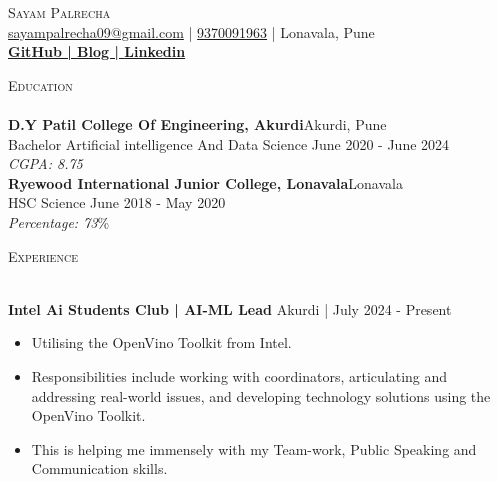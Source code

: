 \documentclass[a4paper]{article}
\newcommand{\lineunder} {
    \vspace*{-8pt} \\
    \hspace*{-18pt} \hrulefill \\
}
\newcommand{\header} [1] {
    {\hspace*{-18pt}\vspace*{6pt} \textsc{#1}}
    \vspace*{-6pt} \lineunder
}
\begin{document}
    \vspace*{-40pt}

    

%
%
  \vspace*{-2pt}
  \begin{center}
    {\Huge \scshape {Sayam Palrecha}}\\
    \vspace*{2pt}
    \href{mailto:sayampalrecha09@gmail.com}{sayampalrecha09@gmail.com} | \href{tel:9370091963}{9370091963} | Lonavala, Pune\\
    \vspace*{2pt}
    \textbf{\href{https://github.com/sayampalrecha}{GitHub | }}\textbf{\href{https://medium.com/@sayampalrecha09}{Blog | }}\textbf{\href{https://www.linkedin.com/in/sayampalrecha/}{Linkedin}}\\
  \end{center}



      \header{Education}
      \vspace{2mm}
      \textbf{D.Y Patil College Of Engineering, Akurdi}\hfill Akurdi, Pune\\
Bachelor Artificial intelligence And Data Science \hfill June 2020 - June 2024\\
{\sl CGPA: 8.75}\\
\vspace{2mm}
      \textbf{Ryewood International Junior College, Lonavala}\hfill Lonavala\\
HSC Science \hfill June 2018 - May 2020\\
{\sl Percentage: 73}\%\\
\vspace{2mm}

      \header{Experience}
      \vspace{2mm}

      \textbf{Intel Ai Students Club | AI-ML Lead} \hfill Akurdi | July 2024 - Present\\
          \vspace{-3mm}
\begin{itemize} \itemsep -3pt
\item Utilising the OpenVino Toolkit from Intel.
\item Responsibilities include working with coordinators, articulating and addressing real-world issues, and developing technology solutions using the OpenVino Toolkit.
\item  This is helping me immensely with my Team-work, Public Speaking and Communication skills.
\end{itemize}
\end{document}
